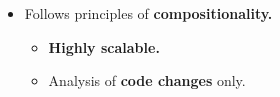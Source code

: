 \documentclass[a1paper, blockverticalspace=1cm]{tikzposter}
\begin{document}
{\begin{minipage}[T]{.35 \linewidth}
\begin{itemize}
\begin{itemize}
                \item
                    Checks for, e.g., buffer overflow, thread-safety,
                    null-dereferencing or memory leaks.
            \end{itemize}

        \item
            Follows principles of \textbf{compositionality.}
            \begin{itemize}
                \small

                \item
                    \textbf{Highly scalable.}

                \item
                    Analysis of \textbf{code changes} only.
            \end{itemize}
    \end{itemize}
\end{minipage}
\vspace{-.5em}
}
\end{document}
